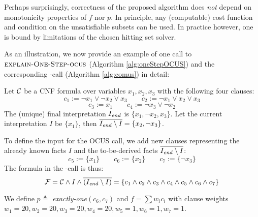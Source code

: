 Perhaps surprisingly, correctness of the proposed algorithm does \emph{not} depend on monotonicity properties of $f$ nor $p$. In principle, any (computable) cost function and condition on the unsatisfiable subsets can be used. In practice however, one is bound by limitations of the chosen hitting set solver.

As an illustration, we now provide an example of one call to $\textsc{explain-One-Step-ocus}$ (Algorithm 
\ref{alg:oneStepOCUS}) and the corresponding \comus-call (Algorithm \ref{alg:comus}) in detail: 
\begin{example}
	Let $\mathcal{C} $ be a CNF formula over variables $x_1, x_2, x_3$ with the following four clauses:
		\[ c_1 := \lnot x_1 \vee \lnot x_2 \vee x_3 \qquad  c_2 := \lnot x_1 \vee  x_2 \vee x_3\] \[  c_3 := x_1 \qquad c_4 := \lnot x_3 \vee \lnot x_2 \]
	 The (unique) final interpretation $I_\mathit{end} $ is $\{x_1, \lnot x_2,  x_3\}$. Let the current interpretation $I$ be $\{ x_1\}$, then $\overline{I_\mathit{end} \setminus I} =  \{x_2, \lnot x_3\}$.
	 
	 To define the input for the OCUS call, we add new clauses representing the already known facts $I$ and the to-be-derived facts $\overline{I_\mathit{end} \setminus I}$: 
	 \[ c_5 := \{x_1\}\qquad  c_6:=\{x_2\} \qquad  c_7 := \{\lnot x_3\}\]
	 The formula \formula in the \comus-call is thus: 
	 \[\mathcal{F} = \mathcal{C} \land I \land \overline{(I_\mathit{end} \setminus I)} = \{ c_1 \wedge c_2 \wedge c_3\wedge c_4\wedge c_5\wedge c_6\wedge c_7\}\]	
	 	 
	 We define $p\triangleq$ \textit{exactly-one$(c_6, c_7)$} and $f = \sum w_ic_i$ with clause weights $w_1 = 20, w_2=20, w_3=20, w_4=20, w_5=1, w_6=1, w_7=1$.
	 

\end{example}

